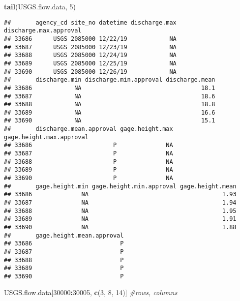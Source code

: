 \documentclass[]{article}
\newenvironment{Shaded}{\begin{snugshade}}{\end{snugshade}}
\newcommand{\CommentTok}[1]{\textcolor[rgb]{0.56,0.35,0.01}{\textit{#1}}}
\newcommand{\DecValTok}[1]{\textcolor[rgb]{0.00,0.00,0.81}{#1}}
\newcommand{\KeywordTok}[1]{\textcolor[rgb]{0.13,0.29,0.53}{\textbf{#1}}}
\newcommand{\NormalTok}[1]{#1}
\newcommand{\OperatorTok}[1]{\textcolor[rgb]{0.81,0.36,0.00}{\textbf{#1}}}
\begin{document}
\begin{Shaded}
\begin{Highlighting}[]
\KeywordTok{tail}\NormalTok{(USGS.flow.data, }\DecValTok{5}\NormalTok{)}
\end{Highlighting}
\end{Shaded}

\begin{verbatim}
##       agency_cd site_no datetime discharge.max discharge.max.approval
## 33686      USGS 2085000 12/22/19            NA                       
## 33687      USGS 2085000 12/23/19            NA                       
## 33688      USGS 2085000 12/24/19            NA                       
## 33689      USGS 2085000 12/25/19            NA                       
## 33690      USGS 2085000 12/26/19            NA                       
##       discharge.min discharge.min.approval discharge.mean
## 33686            NA                                  18.1
## 33687            NA                                  18.6
## 33688            NA                                  18.8
## 33689            NA                                  16.6
## 33690            NA                                  15.1
##       discharge.mean.approval gage.height.max gage.height.max.approval
## 33686                       P              NA                         
## 33687                       P              NA                         
## 33688                       P              NA                         
## 33689                       P              NA                         
## 33690                       P              NA                         
##       gage.height.min gage.height.min.approval gage.height.mean
## 33686              NA                                      1.93
## 33687              NA                                      1.94
## 33688              NA                                      1.95
## 33689              NA                                      1.91
## 33690              NA                                      1.88
##       gage.height.mean.approval
## 33686                         P
## 33687                         P
## 33688                         P
## 33689                         P
## 33690                         P
\end{verbatim}

\begin{Shaded}
\begin{Highlighting}[]
\NormalTok{USGS.flow.data[}\DecValTok{30000}\OperatorTok{:}\DecValTok{30005}\NormalTok{, }\KeywordTok{c}\NormalTok{(}\DecValTok{3}\NormalTok{, }\DecValTok{8}\NormalTok{, }\DecValTok{14}\NormalTok{)] }\CommentTok{#rows, columns}
\end{Highlighting}
\end{Shaded}
\end{document}
